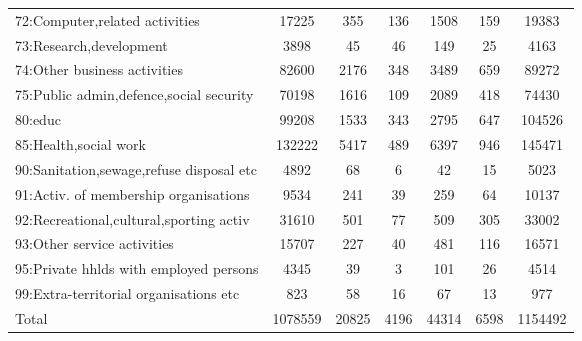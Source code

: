 {\begin{tabular}{l*{6}{c}}
72:Computer,related activities&       17225&         355&         136&        1508&         159&       19383\\
73:Research,development&        3898&          45&          46&         149&          25&        4163\\
74:Other business activities&       82600&        2176&         348&        3489&         659&       89272\\
75:Public admin,defence,social security&       70198&        1616&         109&        2089&         418&       74430\\
80:educ     &       99208&        1533&         343&        2795&         647&      104526\\
85:Health,social work&      132222&        5417&         489&        6397&         946&      145471\\
90:Sanitation,sewage,refuse disposal etc&        4892&          68&           6&          42&          15&        5023\\
91:Activ. of membership organisations&        9534&         241&          39&         259&          64&       10137\\
92:Recreational,cultural,sporting activ&       31610&         501&          77&         509&         305&       33002\\
93:Other service activities&       15707&         227&          40&         481&         116&       16571\\
95:Private hhlds with employed persons&        4345&          39&           3&         101&          26&        4514\\
99:Extra-territorial organisations etc&         823&          58&          16&          67&          13&         977\\
Total       &     1078559&       20825&        4196&       44314&        6598&     1154492\\
\hline\hline
\end{tabular}
}
